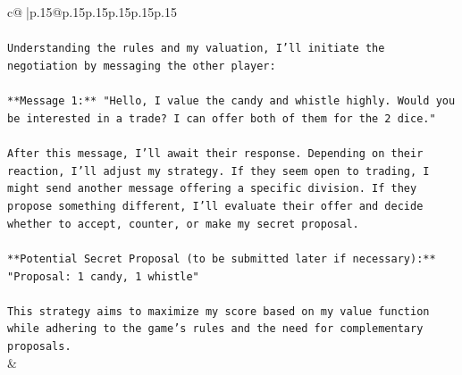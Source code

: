 \documentclass{article}
\begin{document}
{\begin{supertabular}{c@{$\;$}|p{.15\linewidth}@{}p{.15\linewidth}p{.15\linewidth}p{.15\linewidth}p{.15\linewidth}p{.15\linewidth}}
{{{\\ 
\\ 
\texttt{Understanding the rules and my valuation, I'll initiate the negotiation by messaging the other player:} \\
\\ 
\texttt{**Message 1:** "Hello, I value the candy and whistle highly. Would you be interested in a trade? I can offer both of them for the 2 dice."} \\
\\ 
\texttt{After this message, I'll await their response. Depending on their reaction, I'll adjust my strategy. If they seem open to trading, I might send another message offering a specific division. If they propose something different, I'll evaluate their offer and decide whether to accept, counter, or make my secret proposal.} \\
\\ 
\texttt{**Potential Secret Proposal (to be submitted later if necessary):**} \\
\texttt{"Proposal: 1 candy, 1 whistle"} \\
\\ 
\texttt{This strategy aims to maximize my score based on my value function while adhering to the game's rules and the need for complementary proposals.} \\
            }
        }
    }
    & \\ \\


\end{supertabular}}
\end{document}
